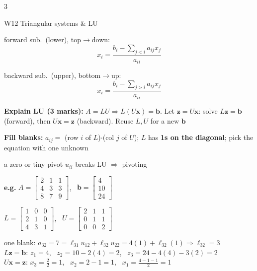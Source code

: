 \documentclass[8pt,a4paper]{extarticle}
\newcommand{\hd}[1]{\par\vspace{3pt}\noindent\colorbox{accent}{\parbox{\dimexpr\linewidth-2\fboxsep}{\color{white}\bfseries\strut #1}}\par\vspace{1pt}}
\newcommand{\sub}[1]{\textbf{\color{accent}#1}}
\newenvironment{ex}[1]{\par\vspace{2pt}\noindent\begin{lrbox}{\exbox}\begin{minipage}{\dimexpr\linewidth-2\fboxsep}\RaggedRight\color{grn}\textbf{e.g.} #1\par\setlength{\parskip}{1.5pt}}{\end{minipage}\end{lrbox}\colorbox{exbg}{\usebox{\exbox}}\par\vspace{1pt}}
\begin{document}
\begin{multicols*}{3}
\columnbreak
\hd{W12 Triangular systems \& LU}
\begin{tl}
\item forward sub.\ (lower), top$\to$down: \[x_i=\frac{b_i-\sum_{j<i}a_{ij}x_j}{a_{ii}}\]
\item backward sub.\ (upper), bottom$\to$up: \[x_i=\frac{b_i-\sum_{j>i}a_{ij}x_j}{a_{ii}}\]
\item \sub{Explain LU (3 marks):} $A=LU\Rightarrow L(U\mathbf x)=\mathbf b$. Let $\mathbf z=U\mathbf x$: solve $L\mathbf z=\mathbf b$ (forward), then $U\mathbf x=\mathbf z$ (backward). Reuse $L,U$ for a new $\mathbf b$
\item \sub{Fill blanks:} $a_{ij}=$ (row $i$ of $L$)$\cdot$(col $j$ of $U$); $L$ has \textbf{1s on the diagonal}; pick the equation with one unknown
\item a zero or tiny pivot $u_{ii}$ breaks LU $\Rightarrow$ pivoting
\end{tl}
\begin{ex}{$A=\begin{bmatrix}2&1&1\\4&3&3\\8&7&9\end{bmatrix}$, \ $\mathbf b=\begin{bmatrix}4\\10\\24\end{bmatrix}$}
$L=\begin{bmatrix}1&0&0\\2&1&0\\4&3&1\end{bmatrix}$, \ $U=\begin{bmatrix}2&1&1\\0&1&1\\0&0&2\end{bmatrix}$

one blank: $a_{32}=7=\ell_{31}u_{12}+\ell_{32}u_{22}=4(1)+\ell_{32}(1)\Rightarrow\ell_{32}=3$\\
$L\mathbf z=\mathbf b$: $z_1=4$, \ $z_2=10-2(4)=2$, \ $z_3=24-4(4)-3(2)=2$\\
$U\mathbf x=\mathbf z$: $x_3=\frac22=1$, \ $x_2=2-1=1$, \ $x_1=\frac{4-1-1}{2}=1$
\end{ex}


\end{multicols*}
\end{document}
